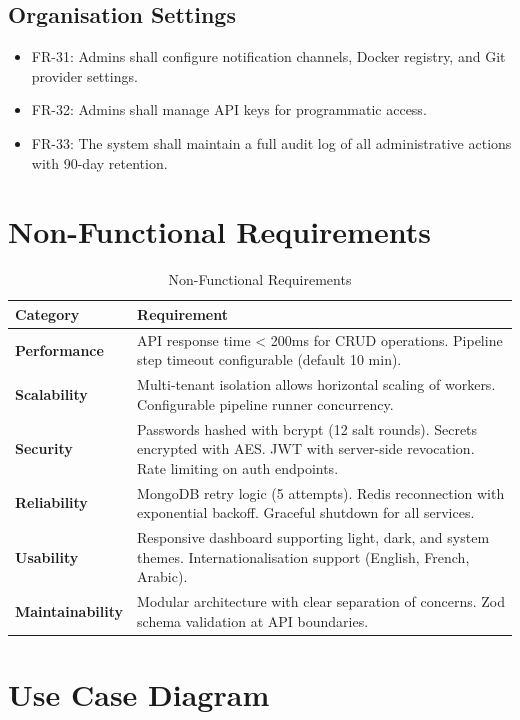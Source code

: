 \documentclass[12pt,a4paper,twoside]{report}
\begin{document}
\subsection{Organisation Settings}
\begin{itemize}[noitemsep]
  \item FR-31: Admins shall configure notification channels, Docker registry, and Git provider settings.
  \item FR-32: Admins shall manage API keys for programmatic access.
  \item FR-33: The system shall maintain a full audit log of all administrative actions with 90-day retention.
\end{itemize}

\section{Non-Functional Requirements}

\begin{table}[H]
\centering
\caption{Non-Functional Requirements}
\label{tab:nfr}
\begin{tabularx}{\textwidth}{l|X}
\toprule
\textbf{Category} & \textbf{Requirement} \\
\midrule
\textbf{Performance} & API response time < 200ms for CRUD operations. Pipeline step timeout configurable (default 10 min). \\
\textbf{Scalability} & Multi-tenant isolation allows horizontal scaling of workers. Configurable pipeline runner concurrency. \\
\textbf{Security} & Passwords hashed with bcrypt (12 salt rounds). Secrets encrypted with AES. JWT with server-side revocation. Rate limiting on auth endpoints. \\
\textbf{Reliability} & MongoDB retry logic (5 attempts). Redis reconnection with exponential backoff. Graceful shutdown for all services. \\
\textbf{Usability} & Responsive dashboard supporting light, dark, and system themes. Internationalisation support (English, French, Arabic). \\
\textbf{Maintainability} & Modular architecture with clear separation of concerns. Zod schema validation at API boundaries. \\
\bottomrule
\end{tabularx}
\end{table}

\section{Use Case Diagram}
\end{document}

